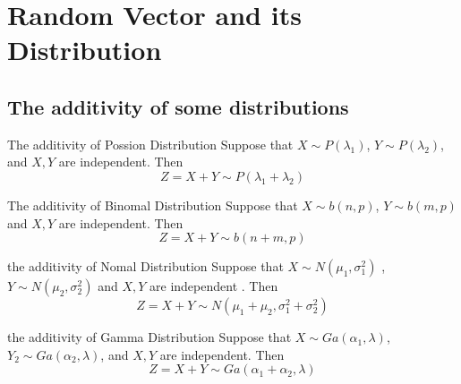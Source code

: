 \documentclass[../main.tex]{subfiles}
\begin{document}
\ifSubfilesClassLoaded{

    
}{}

\chapter{ Random Vector and its Distribution }

\section{The additivity of some distributions}

\begin{example}{The additivity of Possion Distribution}{}
    Suppose that \(  X \sim P\left(  \lambda _1  \right)   \), \(  Y\sim P\left(  \lambda _2  \right)   \), and \(  X,Y  \) are independent. Then \[
    Z= X+ Y\sim P\left(  \lambda _1 +  \lambda _2  \right) 
    \]   
\end{example}

\begin{example}{The additivity of Binomal Distribution}{}
    Suppose that \(  X\sim b\left( n,p \right)   \), \(  Y\sim b\left( m,p \right)   \) and \(  X,Y  \) are independent. Then \[
    Z= X+ Y\sim b\left( n+ m,p \right) 
    \]   
\end{example}

\begin{example}{the additivity of Nomal Distribution}{}
    Suppose that \(  X\sim N\left( \mu _1 , \sigma _1 ^{2} \right)   \) , \(  Y\sim N\left( \mu _2 , \sigma _2 ^{2} \right)   \) and \(  X,Y  \) are independent . Then \[
    Z= X+ Y\sim N\left( \mu _1 + \mu _2 , \sigma _1 ^{2}+  \sigma _2 ^{2} \right) 
    \]  
\end{example}

\begin{example}{the additivity of Gamma Distribution}{}
    Suppose that \(  X\sim Ga\left( \alpha _1 , \lambda  \right)   \), \(  Y_2\sim Ga\left( \alpha _2 , \lambda \right)   \), and \(  X,Y  \) are independent. Then \[
    Z= X+ Y\sim Ga\left( \alpha _1 + \alpha _2 , \lambda  \right) 
    \]   
\end{example}
\end{document}

